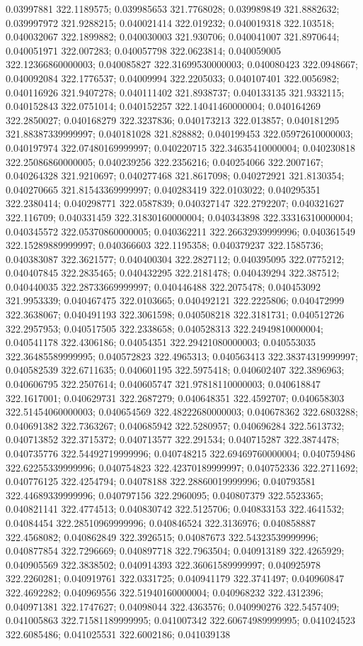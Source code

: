 0.03997881 322.1189575; 0.039985653 321.7768028; 0.039989849 321.8882632; 0.039997972 321.9288215; 0.040021414 322.019232; 0.040019318 322.103518; 0.040032067 322.1899882; 0.040030003 321.930706; 0.040041007 321.8970644; 0.040051971 322.007283; 0.040057798 322.0623814; 0.040059005 322.12366860000003; 0.040085827 322.31699530000003; 0.040080423 322.0948667; 0.040092084 322.1776537; 0.04009994 322.2205033; 0.040107401 322.0056982; 0.040116926 321.9407278; 0.040111402 321.8938737; 0.040133135 321.9332115; 0.040152843 322.0751014; 0.040152257 322.14041460000004; 0.040164269 322.2850027; 0.040168279 322.3237836; 0.040173213 322.013857; 0.040181295 321.88387339999997; 0.040181028 321.828882; 0.040199453 322.05972610000003; 0.040197974 322.07480169999997; 0.040220715 322.34635410000004; 0.040230818 322.25086860000005; 0.040239256 322.2356216; 0.040254066 322.2007167; 0.040264328 321.9210697; 0.040277468 321.8617098; 0.040272921 321.8130354; 0.040270665 321.81543369999997; 0.040283419 322.0103022; 0.040295351 322.2380414; 0.040298771 322.0587839; 0.040327147 322.2792207; 0.040321627 322.116709; 0.040331459 322.31830160000004; 0.040343898 322.33316310000004; 0.040345572 322.05370860000005; 0.040362211 322.26632939999996; 0.040361549 322.15289889999997; 0.040366603 322.1195358; 0.040379237 322.1585736; 0.040383087 322.3621577; 0.040400304 322.2827112; 0.040395095 322.0775212; 0.040407845 322.2835465; 0.040432295 322.2181478; 0.040439294 322.387512; 0.040440035 322.28733669999997; 0.040446488 322.2075478; 0.040453092 321.9953339; 0.040467475 322.0103665; 0.040492121 322.2225806; 0.040472999 322.3638067; 0.040491193 322.3061598; 0.040508218 322.3181731; 0.040512726 322.2957953; 0.040517505 322.2338658; 0.040528313 322.24949810000004; 0.040541178 322.4306186; 0.04054351 322.29421080000003; 0.040553035 322.36485589999995; 0.040572823 322.4965313; 0.040563413 322.38374319999997; 0.040582539 322.6711635; 0.040601195 322.5975418; 0.040602407 322.3896963; 0.040606795 322.2507614; 0.040605747 321.97818110000003; 0.040618847 322.1617001; 0.040629731 322.2687279; 0.040648351 322.4592707; 0.040658303 322.51454060000003; 0.040654569 322.48222680000003; 0.040678362 322.6803288; 0.040691382 322.7363267; 0.040685942 322.5280957; 0.040696284 322.5613732; 0.040713852 322.3715372; 0.040713577 322.291534; 0.040715287 322.3874478; 0.040735776 322.54492719999996; 0.040748215 322.69469760000004; 0.040759486 322.62255339999996; 0.040754823 322.42370189999997; 0.040752336 322.2711692; 0.040776125 322.4254794; 0.04078188 322.28860019999996; 0.040793581 322.44689339999996; 0.040797156 322.2960095; 0.040807379 322.5523365; 0.040821141 322.4774513; 0.040830742 322.5125706; 0.040833153 322.4641532; 0.04084454 322.28510969999996; 0.040846524 322.3136976; 0.040858887 322.4568082; 0.040862849 322.3926515; 0.04087673 322.54323539999996; 0.040877854 322.7296669; 0.040897718 322.7963504; 0.040913189 322.4265929; 0.040905569 322.3838502; 0.040914393 322.36061589999997; 0.040925978 322.2260281; 0.040919761 322.0331725; 0.040941179 322.3741497; 0.040960847 322.4692282; 0.040969556 322.51940160000004; 0.040968232 322.4312396; 0.040971381 322.1747627; 0.04098044 322.4363576; 0.040990276 322.5457409; 0.041005863 322.71581189999995; 0.041007342 322.60674989999995; 0.041024523 322.6085486; 0.041025531 322.6002186; 0.041039138 